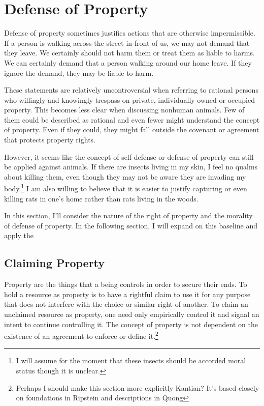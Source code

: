 \documentclass[12pt]{book}
\begin{document}
\section{Defense of Property}

	Defense of property sometimes justifies actions that are otherwise
	impermissible. If a person is walking across the street in front of us, we
	may not demand that they leave. We certainly should not harm them or treat
	them as liable to harms.  We can certainly demand that a person walking
	around our home leave. If they ignore the demand, they may be liable to
	harm.

	These statements are relatively uncontroversial when referring to rational
	persons who willingly and knowingly trespass on private, individually owned
	or occupied property. This becomes less clear when discussing nonhuman
	animals. Few of them could be described as rational and even fewer might
	understand the concept of property. Even if they could, they might fall
	outside the covenant or agreement that protects property rights.

	However, it seems like the concept of self-defense or defense of
	property can still be applied against animals.  If there are insects living
	in my skin, I feel no qualms about killing them, even though they may not
	be aware they are invading my body.\footnote{I will assume for the moment
	that these insects should be accorded moral status though it is unclear.}
	I am also willing to believe that it is easier to justify capturing or even
	killing rats in one’s home rather than rats living in the woods.

	In this section, I’ll consider the nature of the right of property and the
	morality of defense of property. In the following section, I will expand
	on this baseline and apply the 

	\subsection{Claiming Property}

	Property are the things that a being controls in order to secure their
	ends.  To hold a resource as property is to have a rightful claim to use it
	for any purpose that does not interfere with the choice or similar right of
	another.  To claim an unclaimed resource as property, one need only
	empirically control it and signal an intent to continue controlling it.
	The concept of property is not dependent on the existence of an agreement to
	enforce or define it.\footnote{Perhaps I should make this section more
	explicitly Kantian? It’s based closely on foundations in Ripstein and
	descriptions in Quong}
\end{document}
